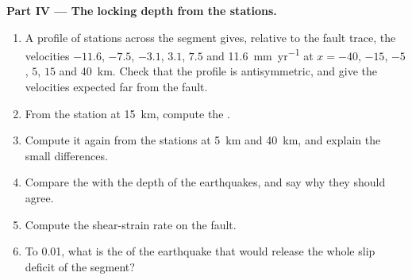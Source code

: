 \begin{problem}
\medskip
\noindent\textbf{Part IV --- The locking depth from the stations.}
\begin{enumerate}[resume]
  \item A profile of stations across the segment gives, relative to the fault
        trace, the velocities $-11.6$, $-7.5$, $-3.1$, $3.1$, $7.5$ and
        \qty{11.6}{mm.yr^{-1}} at $x = -40$, $-15$, $-5$, $5$, $15$ and
        \qty{40}{km}. Check that the profile is antisymmetric, and give the
        velocities expected far from the fault.
  \item From the station at \qty{15}{km}, compute the .
  \item Compute it again from the stations at \qty{5}{km} and \qty{40}{km}, and
        explain the small differences.
  \item Compare the  with the depth of the earthquakes, and say
        why they should agree.
  \item Compute the shear-strain rate on the fault.
  \item To 0.01, what is the  of the earthquake that would
        release the whole slip deficit of the segment?
\end{enumerate}
\end{problem}
